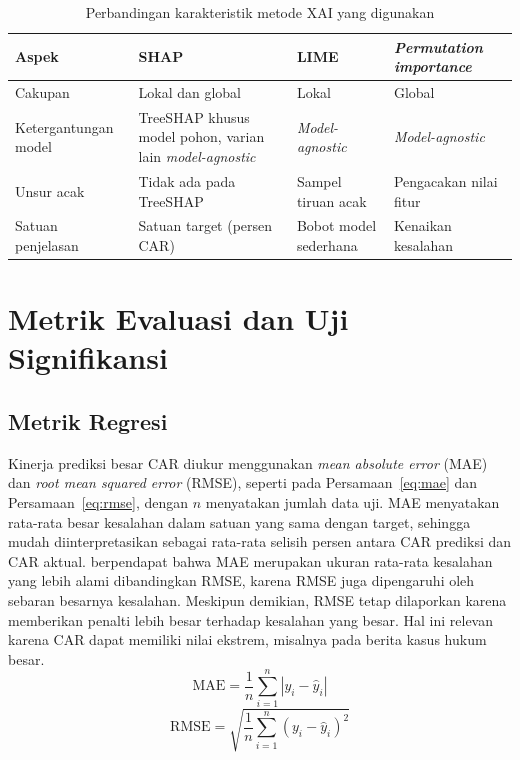 \begin{table}[t]
  \centering
  \caption{Perbandingan karakteristik metode XAI yang digunakan}
  \label{tab:metode-xai}
  \begin{tabularx}{\textwidth}{| >{\raggedright\arraybackslash}p{3.0cm} | >{\raggedright\arraybackslash}X | >{\raggedright\arraybackslash}X | >{\raggedright\arraybackslash}X |}
    \hline
    \textbf{Aspek} & \textbf{SHAP} & \textbf{LIME} & \textbf{\emph{Permutation importance}} \\
    \hline
    Cakupan & Lokal dan global & Lokal & Global \\
    \hline
    Ketergantungan model & TreeSHAP khusus model pohon, varian lain \emph{model-agnostic} & \emph{Model-agnostic} & \emph{Model-agnostic} \\
    \hline
    Unsur acak & Tidak ada pada TreeSHAP & Sampel tiruan acak & Pengacakan nilai fitur \\
    \hline
    Satuan penjelasan & Satuan target (persen CAR) & Bobot model sederhana & Kenaikan kesalahan \\
    \hline
  \end{tabularx}
\end{table}

\section{Metrik Evaluasi dan Uji Signifikansi}
\label{sec:metrik-evaluasi}

\subsection{Metrik Regresi}

Kinerja prediksi besar CAR diukur menggunakan \emph{mean absolute error} (MAE) dan \emph{root mean squared error} (RMSE), seperti pada Persamaan~\ref{eq:mae} dan Persamaan~\ref{eq:rmse}, dengan $n$ menyatakan jumlah data uji. MAE menyatakan rata-rata besar kesalahan dalam satuan yang sama dengan target, sehingga mudah diinterpretasikan sebagai rata-rata selisih persen antara CAR prediksi dan CAR aktual. \textcite{willmott2005} berpendapat bahwa MAE merupakan ukuran rata-rata kesalahan yang lebih alami dibandingkan RMSE, karena RMSE juga dipengaruhi oleh sebaran besarnya kesalahan. Meskipun demikian, RMSE tetap dilaporkan karena memberikan penalti lebih besar terhadap kesalahan yang besar. Hal ini relevan karena CAR dapat memiliki nilai ekstrem, misalnya pada berita kasus hukum besar.
\begin{equation}
\mathrm{MAE} = \frac{1}{n} \sum_{i=1}^{n} \left| y_i - \hat{y}_i \right|
\label{eq:mae}
\end{equation}
\begin{equation}
\mathrm{RMSE} = \sqrt{\frac{1}{n} \sum_{i=1}^{n} \left( y_i - \hat{y}_i \right)^2}
\label{eq:rmse}
\end{equation}

